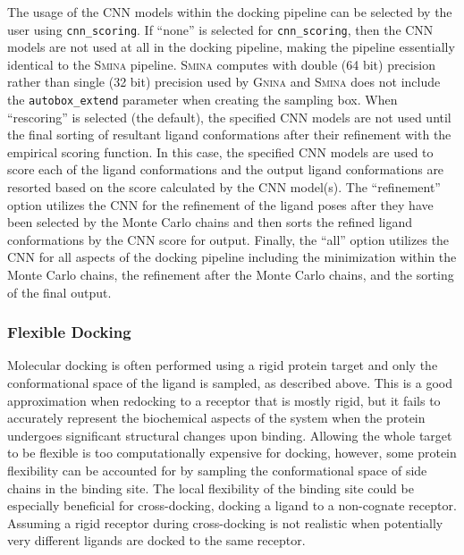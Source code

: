 \documentclass[journal=jcisd8,manuscript=article]{achemso}
\begin{document}
The usage of the CNN models within the docking pipeline can be selected by the user using \texttt{cnn\_scoring}. If ``none'' is selected for \texttt{cnn\_scoring}, then the CNN models are not used at all in the docking pipeline, making the pipeline essentially identical to the \textsc{Smina} pipeline. \textsc{Smina} computes with double (64 bit) precision rather than single (32 bit) precision used by \textsc{Gnina} and \textsc{Smina} does not include the \texttt{autobox\_extend} parameter when creating the sampling box. When ``rescoring'' is selected (the default), the specified CNN models are not used until the final sorting of resultant ligand conformations after their refinement with the empirical scoring function. In this case, the specified CNN models are used to score each of the ligand conformations and the output ligand conformations are resorted based on the score calculated by the CNN model(s). The ``refinement'' option utilizes the CNN for the refinement of the ligand poses after they have been selected by the Monte Carlo chains and then sorts the refined ligand conformations by the CNN score for output. Finally, the ``all'' option utilizes the CNN for all aspects of the docking pipeline including the minimization within the Monte Carlo chains, the refinement after the Monte Carlo chains, and the sorting of the final output. 

\subsubsection{Flexible Docking}

Molecular docking is often performed using a rigid protein target and only the conformational space of the ligand is sampled, as described above. This is a good approximation when redocking to a receptor that is mostly rigid, but it fails to accurately represent the biochemical aspects of the system when the protein undergoes significant structural changes upon binding\cite{Teague2003}. Allowing the whole target to be flexible is too computationally expensive for docking, however, some protein flexibility can be accounted for by sampling the conformational space of side chains in the binding site\cite{Zhao2008}. The local flexibility of the binding site could be especially beneficial for cross-docking, docking a ligand to a non-cognate receptor. Assuming a rigid receptor during cross-docking is not realistic when potentially very different ligands are docked to the same receptor.
\end{document}

